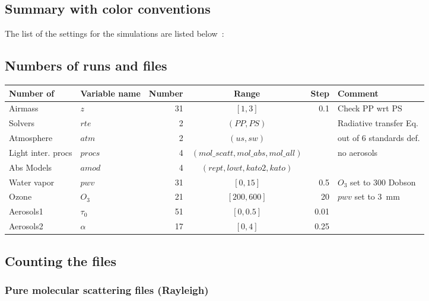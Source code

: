 \documentclass[a4paper]{article}
\begin{document}
\subsection{Summary with color conventions}
The list of the settings for the simulations are listed below~:

\subsection{Numbers of runs and files}

\begin{table}[h]
{\small
\begin{tabular} {|l|l|r|c|r|l|}  \hline\hline
Number of & Variable name & Number & Range & Step & Comment \\ \hline\hline
Airmass    &   $z$                 &     31     & $[1,3]$ & 0.1   & Check PP wrt PS \\
Solvers     & $rte$             &       2      & $(PP,PS)$ &    &  Radiative transfer Eq. \\
Atmosphere &  $atm$       &     2        &  $(us,sw)$ &   &  out of 6 standards def.\\
Light inter. procs    &  $procs$    &   4          & $(mol\_scatt,mol\_abs,mol\_all)$ & & no aerosols \\
Abs Models  & $amod$  & 4 & $(rept,lowt,kato2,kato)$ & &  \\
Water vapor  & $pwv$    & 31 & $[0,15]$ & 0.5  & $O_3$ set to 300 Dobson \\
Ozone        & $O_3$      & 21  & $[200,600]$ & 20 & $pwv$ set to 3~mm \\ \hline
Aerosols1     &  $\tau_0$  & 51  & $[0,0.5]$   & 0.01 &  \\
Aerosols2     & $\alpha$  &  17 & $[0,4]$ & 0.25 &  \\ \hline 
\hline
\end{tabular}
}
\end{table}

\subsection{Counting the files}

\subsubsection{Pure molecular scattering files (Rayleigh)}
\end{document}
